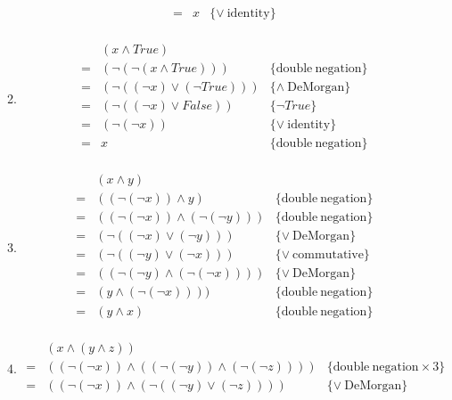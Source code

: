 \documentclass{article}
\begin{document}
\begin{enumerate}
\begin{enumerate}
\[\begin{array}{lll}
            = & x & \{\vee \mathrm{\ identity}\} \\
          \end{array} \]
        \item
          \[ \begin{array}{lll}
              & (x \wedge True) & \\
            = & (\neg (\neg (x \wedge True))) & \{\mathrm{double\ negation}\} \\
            = & (\neg ((\neg x) \vee (\neg True))) & \{\wedge \mathrm{\ DeMorgan}\} \\
            = & (\neg ((\neg x) \vee False)) & \{\neg True\} \\
            = & (\neg (\neg x)) & \{\vee \mathrm{\ identity}\} \\
            = & x & \{\mathrm{double\ negation}\} \\
          \end{array} \]
        \item
          \[ \begin{array}{lll}
              & (x \wedge y) & \\
            = & ((\neg (\neg x)) \wedge y) & \{\mathrm{double\ negation}\} \\
            = & ((\neg (\neg x)) \wedge (\neg (\neg y))) & \{\mathrm{double\ negation}\} \\
            = & (\neg ((\neg x) \vee (\neg y))) & \{\vee \mathrm{\ DeMorgan}\} \\
            = & (\neg ((\neg y) \vee (\neg x))) & \{\vee \mathrm{\ commutative}\} \\
            = & ((\neg (\neg y) \wedge (\neg (\neg x)))) & \{\vee \mathrm{\ DeMorgan}\} \\
            = & (y \wedge (\neg (\neg x)))) & \{\mathrm{double\ negation}\} \\
            = & (y \wedge x) & \{\mathrm{double\ negation}\} \\
          \end{array} \]
        \item
          \[ \begin{array}{lll}
              & (x \wedge (y \wedge z)) & \\
            = & ((\neg (\neg x)) \wedge ((\neg (\neg y)) \wedge (\neg(\neg z)))) & \{\mathrm{double\ negation}\times 3\} \\
            = & ((\neg (\neg x)) \wedge (\neg ((\neg y) \vee (\neg z)))) & \{\vee \mathrm{\ DeMorgan}\} \\

\end{array}\]
\end{enumerate}
\end{enumerate}
\end{document}
